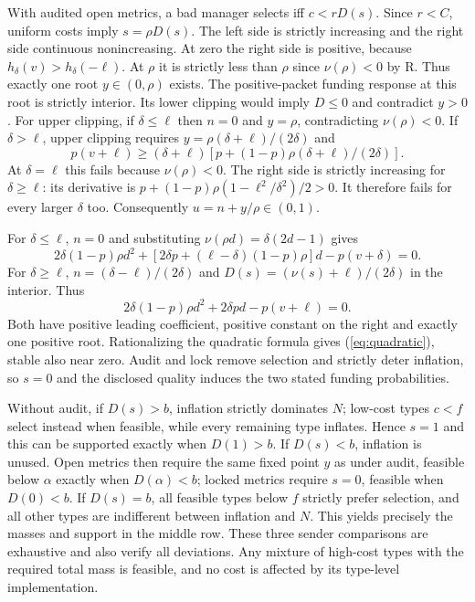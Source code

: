 \documentclass[11pt]{article}
\begin{document}
With audited open metrics, a bad manager selects iff $c<rD(s)$. Since $r<C$, uniform costs imply $s=\rho D(s)$. The left side is strictly increasing and the right side continuous nonincreasing. At zero the right side is positive, because $h_\delta(v)>h_\delta(-\ell)$. At $\rho$ it is strictly less than $\rho$ since $\nu(\rho)<0$ by R. Thus exactly one root $y\in(0,\rho)$ exists. The positive-packet funding response at this root is strictly interior. Its lower clipping would imply $D\leq0$ and contradict $y>0$. For upper clipping, if $\delta\leq\ell$ then $n=0$ and $y=\rho$, contradicting $\nu(\rho)<0$. If $\delta>\ell$, upper clipping requires $y=\rho(\delta+\ell)/(2\delta)$ and
\[
p(v+\ell)\geq(\delta+\ell)\left[p+(1-p)\rho(\delta+\ell)/(2\delta)\right].
\]
At $\delta=\ell$ this fails because $\nu(\rho)<0$. The right side is strictly increasing for $\delta\geq\ell$: its derivative is $p+(1-p)\rho(1-\ell^2/\delta^2)/2>0$. It therefore fails for every larger $\delta$ too. Consequently $u=n+y/\rho\in(0,1)$.

For $\delta\leq\ell$, $n=0$ and substituting $\nu(\rho d)=\delta(2d-1)$ gives
\[
2\delta(1-p)\rho d^2+[2\delta p+(\ell-\delta)(1-p)\rho]d-p(v+\delta)=0.
\]
For $\delta\geq\ell$, $n=(\delta-\ell)/(2\delta)$ and $D(s)=(\nu(s)+\ell)/(2\delta)$ in the interior. Thus
\[
2\delta(1-p)\rho d^2+2\delta p d-p(v+\ell)=0.
\]
Both have positive leading coefficient, positive constant on the right and exactly one positive root. Rationalizing the quadratic formula gives (\ref{eq:quadratic}), stable also near zero. Audit and lock remove selection and strictly deter inflation, so $s=0$ and the disclosed quality induces the two stated funding probabilities.

Without audit, if $D(s)>b$, inflation strictly dominates $N$; low-cost types $c<f$ select instead when feasible, while every remaining type inflates. Hence $s=1$ and this can be supported exactly when $D(1)>b$. If $D(s)<b$, inflation is unused. Open metrics then require the same fixed point $y$ as under audit, feasible below $\alpha$ exactly when $D(\alpha)<b$; locked metrics require $s=0$, feasible when $D(0)<b$. If $D(s)=b$, all feasible types below $f$ strictly prefer selection, and all other types are indifferent between inflation and $N$. This yields precisely the masses and support in the middle row. These three sender comparisons are exhaustive and also verify all deviations. Any mixture of high-cost types with the required total mass is feasible, and no cost is affected by its type-level implementation.
\end{document}
